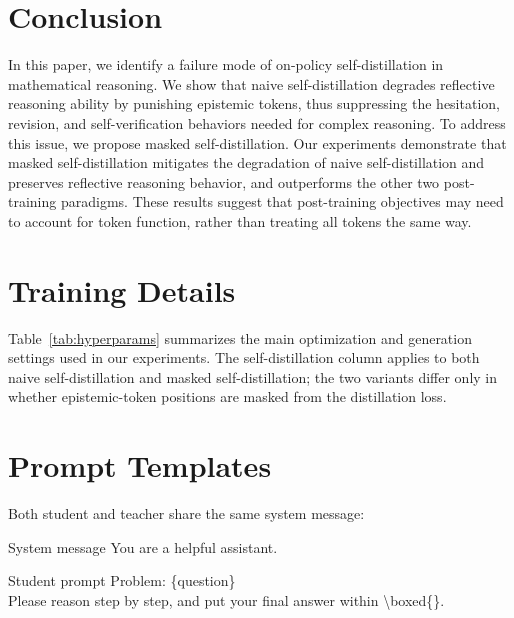 \documentclass[11pt]{article}
\begin{document}
\section{Conclusion}
In this paper, we identify a failure mode of on-policy self-distillation in mathematical reasoning. 
We show that naive self-distillation degrades reflective reasoning ability by punishing epistemic tokens, thus suppressing the hesitation, revision, and self-verification behaviors needed for complex reasoning.
To address this issue, we propose masked self-distillation. 
Our experiments demonstrate that masked self-distillation mitigates the degradation of naive self-distillation and preserves reflective reasoning behavior, and outperforms the other two post-training paradigms. 
These results suggest that post-training objectives may need to account for token function, rather than treating all tokens the same way.



\clearpage
\appendix

\section{Training Details}
\label{app:hyperparams}

Table~\ref{tab:hyperparams} summarizes the main optimization and generation settings used in our experiments.
The self-distillation column applies to both naive self-distillation and masked self-distillation; the two variants differ only in whether epistemic-token positions are masked from the distillation loss.


\section{Prompt Templates}

Both student and teacher share the same system message:
\begin{promptbox}{System message}
You are a helpful assistant.
\end{promptbox}

\begin{promptbox}{Student prompt}
Problem: \textcolor{PromptVar}{\{question\}}\\[3pt]
Please reason step by step, and put your final answer within \textbackslash boxed\{\}.
\end{promptbox}
\end{document}
